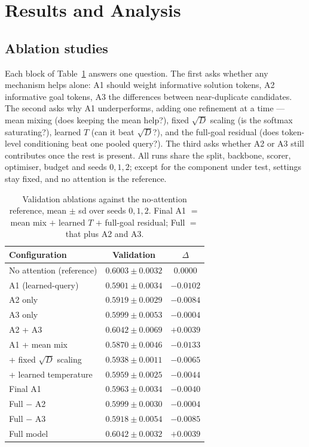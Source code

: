 \documentclass[11pt]{article}
\begin{document}
\section{Results and Analysis}
\label{sec:results}

\subsection{Ablation studies}
\label{sec:ablation}

Each block of Table~\ref{tab:ablation} answers one question. The first asks
whether any mechanism helps alone: A1 should weight informative solution
tokens, A2 informative goal tokens, A3 the differences between near-duplicate
candidates. The second asks why A1 underperforms, adding one refinement at a
time --- mean mixing (does keeping the mean help?), fixed $\sqrt{D}$ scaling
(is the softmax saturating?), learned $T$ (can it beat $\sqrt{D}$?), and the
full-goal residual (does token-level conditioning beat one pooled query?).
The third asks whether A2 or A3 still contributes once the rest is present.
All runs share the split, backbone, scorer, optimiser, budget and seeds
$0,1,2$; except for the component under test, settings stay fixed, and no
attention is the reference.

\begin{table}[tb]
  \centering\small
  \begin{tabular}{@{}lcc@{}}
    \toprule
    \textbf{Configuration} & \textbf{Validation} & \textbf{$\Delta$}\\
    \midrule
    No attention (reference) & $0.6003 \pm 0.0032$ & $0.0000$\\
    A1 (learned-query)       & $0.5901 \pm 0.0034$ & $-0.0102$\\
    A2 only                  & $0.5919 \pm 0.0029$ & $-0.0084$\\
    A3 only                  & $0.5999 \pm 0.0053$ & $-0.0004$\\
    A2 + A3                  & $0.6042 \pm 0.0069$ & $+0.0039$\\
    \midrule
    A1 + mean mix            & $0.5870 \pm 0.0046$ & $-0.0133$\\
    \;\;+ fixed $\sqrt{D}$ scaling & $0.5938 \pm 0.0011$ & $-0.0065$\\
    \;\;+ learned temperature      & $0.5959 \pm 0.0025$ & $-0.0044$\\
    Final A1                 & $0.5963 \pm 0.0034$ & $-0.0040$\\
    \midrule
    Full $-$ A2              & $0.5999 \pm 0.0030$ & $-0.0004$\\
    Full $-$ A3              & $0.5918 \pm 0.0054$ & $-0.0085$\\
    Full model               & $0.6042 \pm 0.0032$ & $+0.0039$\\
    \bottomrule
  \end{tabular}
  \caption{Validation ablations against the no-attention reference, mean
  $\pm$ sd over seeds $0,1,2$. Final A1 $=$ mean mix $+$ learned $T$ $+$
  full-goal residual; Full $=$ that plus A2 and A3.}
  \label{tab:ablation}
\end{table}
\end{document}
